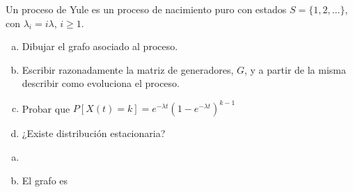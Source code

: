 \documentclass[twoside]{article}
\begin{document}
\begin{ejercicio}{2}
Un proceso de Yule es un proceso de nacimiento puro con estados $S=\{1,2,\dotsc\}$, con $\lambda_i=i\lambda$, $i\geq 1$.
\begin{enumerate}[a)]
\item Dibujar el grafo asociado al proceso.
\item Escribir razonadamente la matriz de generadores, $G$, y a partir de la misma describir como evoluciona el proceso.
\item Probar que $P[X(t)=k]=e^{-\lambda t}(1-e^{-\lambda t})^{k-1}$
\item ¿Existe distribución estacionaria?
\end{enumerate}
\end{ejercicio}
\begin{solucion}
\begin{enumerate}[a)]
\item[]
\item El grafo es


\end{enumerate}
\end{solucion}
\end{document}
